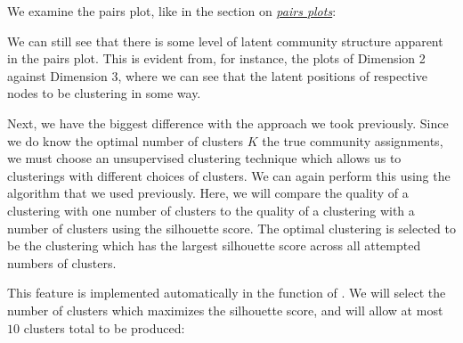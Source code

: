 \documentclass[letterpaper,10pt,english]{jupyterBook}
\begin{document}
\sphinxAtStartPar
We examine the pairs plot,  like in the section on {\hyperref[\detokenize{representations/ch6/estimating-parameters_spectral:link?}]{\emph{pairs plots}}}:

\begin{sphinxVerbatim}[commandchars=\\\{\}]
   
\end{sphinxVerbatim}

\noindent{}

\sphinxAtStartPar
We can still see that there is some level of latent community structure apparent in the pairs plot. This is evident from, for instance, the plots of Dimension 2 against Dimension 3, where we can see that the latent positions of respective nodes  to be clustering in some way.

\sphinxAtStartPar
Next, we have the biggest difference with the approach we took previously. Since we do  know the optimal number of clusters \(K\)  the true community assignments, we must choose an unsupervised clustering technique which allows us to  clusterings with different choices of clusters. We can again perform this using the  algorithm that we used previously. Here, we will compare the quality of a clustering with one number of clusters to the quality of a clustering with a  number of clusters using the silhouette score. The optimal clustering is selected to be the clustering which has the largest silhouette score across all attempted numbers of clusters.

\sphinxAtStartPar
This feature is implemented automatically in the  function of . We will select the number of clusters which maximizes the silhouette score, and will allow at most \(10\) clusters total to be produced:

\begin{sphinxVerbatim}[commandchars=\\\{\}]
   

    
  
\end{sphinxVerbatim}
\end{document}
